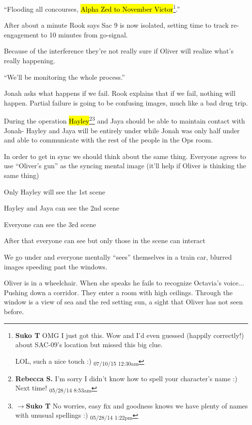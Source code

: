 ``Flooding all concourses, \hl{Alpha Zed to November Victor}\footnote{\textbf{Suko T }OMG I just got this.  Wow and I'd even guessed (happily correctly!) about SAC-09's location but missed this big clue.  

LOL, such a nice touch :) \textsubscript{07/10/15 12:30am}}.''

After about a minute Rook says Sac 9 is now isolated, setting time to track re-engagement to 10 minutes from go-signal. 

Because of the interference they're not really sure if Oliver will realize what's really happening. 

``We'll be monitoring the whole process.''

Jonah asks what happens if we fail.  Rook explains that if we fail, nothing will happen.  Partial failure is going to be confusing images, much like a bad drug trip.

During the operation \hl{Hayley}\footnote{\textbf{Rebecca S. }I'm sorry I didn't know how to spell your character's name :)  Next time! \textsubscript{05/28/14 8:53am}}\footnote{$\rightarrow$\textbf{Suko T }No worries, easy fix and goodness knows we have plenty of names with unusual spellings :) \textsubscript{05/28/14 1:22pm}} and Jaya should be able to maintain contact with Jonah- Hayley and Jaya will be entirely under while Jonah was only half under and able to communicate with the rest of the people in the Ops room.

In order to get in sync we should think about the same thing. Everyone agrees to use ``Oliver's gun'' as the syncing mental image (it'll help if Oliver is thinking the same thing)



Only Hayley will see the 1st scene

Hayley and Jaya can see the 2nd scene

Everyone can see the 3rd scene

After that everyone can see but only those in the scene can interact



We go under and everyone mentally ``sees'' themselves in a train car, blurred images speeding past the windows.




Oliver is in a wheelchair.  When she speaks he fails to recognize Octavia's voice...  Pushing down a corridor.  They enter a room with high ceilings.  Through the window is a view of sea and the red setting sun, a sight that Oliver has not seen before.




